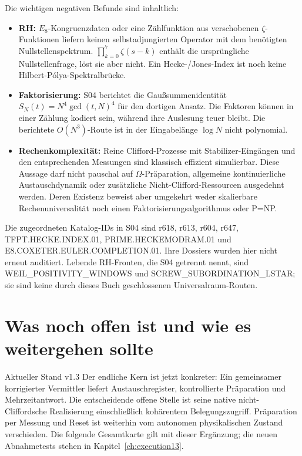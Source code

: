 Die wichtigen negativen Befunde sind inhaltlich:
\begin{itemize}
\item \textbf{RH:} $E_8$-Kongruenzdaten oder eine Zählfunktion aus verschobenen $\zeta$-Funktionen liefern keinen selbstadjungierten Operator mit dem benötigten Nullstellenspektrum. $\prod_{k=0}^7\zeta(s-k)$ enthält die ursprüngliche Nullstellenfrage, löst sie aber nicht. Ein Hecke-/Jones-Index ist noch keine Hilbert-Pólya-Spektralbrücke.
\item \textbf{Faktorisierung:} S04 berichtet die Gaußsummenidentität $S_N(t)=N^4\gcd(t,N)^4$ für den dortigen Ansatz. Die Faktoren können in einer Zählung kodiert sein, während ihre Auslesung teuer bleibt. Die berichtete $O(N^3)$-Route ist in der Eingabelänge $\log N$ nicht polynomial.
\item \textbf{Rechenkomplexität:} Reine Clifford-Prozesse mit Stabilizer-Eingängen und den entsprechenden Messungen sind klassisch effizient simulierbar. Diese Aussage darf nicht pauschal auf $\Omega$-Präparation, allgemeine kontinuierliche Austauschdynamik oder zusätzliche Nicht-Clifford-Ressourcen ausgedehnt werden. Deren Existenz beweist aber umgekehrt weder skalierbare Rechenuniversalität noch einen Faktorisierungsalgorithmus oder P=NP.
\end{itemize}
Die zugeordneten Katalog-IDs in S04 sind r618, r613, r604, r647, TFPT.HECKE.INDEX.01, PRIME.HECKEMODRAM.01 und E8.COXETER.EULER.COMPLETION.01. Ihre Dossiers wurden hier nicht erneut auditiert. Lebende RH-Fronten, die S04 getrennt nennt, sind WEIL\_POSITIVITY\_WINDOWS und SCREW\_SUBORDINATION\_LSTAR; sie sind keine durch dieses Buch geschlossenen Universalraum-Routen.

\chapter{Was noch offen ist und wie es weitergehen sollte}
\label{ch:offen}
\begin{bild}{Aktueller Stand v1.3}
Der endliche Kern ist jetzt konkreter: Ein gemeinsamer korrigierter Vermittler liefert Austauschregister, kontrollierte Präparation und Mehrzeitantwort. Die entscheidende offene Stelle ist seine native nicht-Cliffordsche Realisierung einschließlich kohärentem Belegungszugriff. Präparation per Messung und Reset ist weiterhin vom autonomen physikalischen Zustand verschieden. Die folgende Gesamtkarte gilt mit dieser Ergänzung; die neuen Abnahmetests stehen in Kapitel~\ref{ch:execution13}.
\end{bild}
